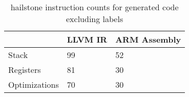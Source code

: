 \begin{table}[h!]
\centering
\begin{tabular}{p{}p{}p{}}
  \hline
 & LLVM IR & ARM Assembly \\ 
  \hline
Stack &  99 &  52 \\ 
  Registers &  81 &  30 \\ 
  Optimizations &  70 &  30 \\ 
   \hline
\end{tabular}
\caption{hailstone instruction counts for generated code excluding labels}
\end{table}
